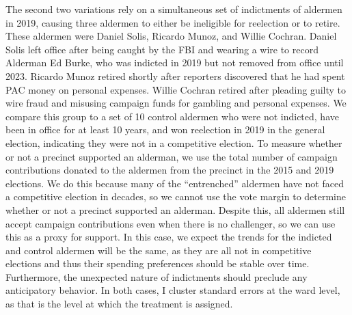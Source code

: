 The second two variations rely on a simultaneous set of indictments of aldermen in 2019, causing three aldermen to either be ineligible for reelection or to retire. 
These aldermen were Daniel Solis, Ricardo Munoz, and Willie Cochran. 
Daniel Solis left office after being caught by the FBI and wearing a wire to record Alderman Ed Burke, who was indicted in 2019 but not removed from office until 2023.
Ricardo Munoz retired shortly after reporters discovered that he had spent PAC money on personal expenses.
Willie Cochran retired after pleading guilty to wire fraud and misusing campaign funds for gambling and personal expenses.
We compare this group to a set of 10 control aldermen who were not indicted, have been in office for at least 10 years, and won reelection in 2019 in the general election, indicating they were not in a competitive election. 
To measure whether or not a precinct supported an alderman, we use the total number of campaign contributions donated to the aldermen from the precinct in the 2015 and 2019 elections.
We do this because many of the ``entrenched'' aldermen have not faced a competitive election in decades, so we cannot use the vote margin to determine whether or not a precinct supported an alderman.
Despite this, all aldermen still accept campaign contributions even when there is no challenger, so we can use this as a proxy for support.
In this case, we expect the trends for the indicted and control aldermen will be the same, as they are all not in competitive elections and thus their spending preferences should be stable over time.
Furthermore, the unexpected nature of indictments should preclude any anticipatory behavior.
In both cases, I cluster standard errors at the ward level, as that is the level at which the treatment is assigned.